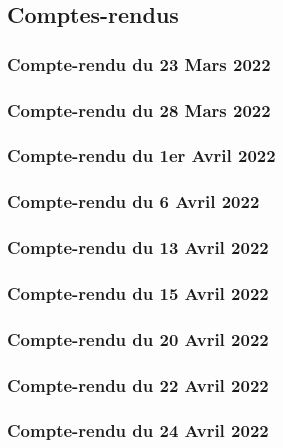 \documentclass{article}
\begin{document}
\subsection{Comptes-rendus}

\subsubsection{Compte-rendu du 23 Mars 2022}


\subsubsection{Compte-rendu du 28 Mars 2022}


\subsubsection{Compte-rendu du 1er Avril 2022}


\subsubsection{Compte-rendu du 6 Avril 2022}


\subsubsection{Compte-rendu du 13 Avril 2022}


\subsubsection{Compte-rendu du 15 Avril 2022}


\subsubsection{Compte-rendu du 20 Avril 2022}


\subsubsection{Compte-rendu du 22 Avril 2022}


\subsubsection{Compte-rendu du 24 Avril 2022}

\end{document}
